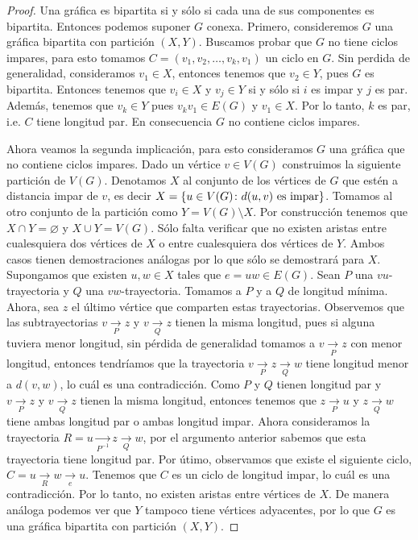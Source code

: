 \begin{proof}
    Una gr\'afica es bipartita si y s\'olo si cada una de sus componentes es
    bipartita. Entonces podemos suponer $G$ conexa. Primero, consideremos $G$
    una gr\'afica bipartita con partici\'on $(X,Y)$. Buscamos probar que $G$ no
    tiene ciclos impares, para esto tomamos $C=(v_1,v_2,\dots, v_k,v_1)$ un
    ciclo en $G$. Sin perdida de generalidad, consideramos $v_1 \in X$, entonces
    tenemos que $v_2 \in Y$, pues $G$ es bipartita. Entonces tenemos que $v_i
    \in X$ y $v_j \in Y$ si y s\'olo si $i$ es impar y $j$ es par. Adem\'as,
    tenemos que $v_k \in Y$ pues $v_k v_1 \in E(G)$ y $v_1 \in X$. Por lo tanto,
    $k$ es par, i.e. $C$ tiene longitud par. En consecuencia $G$ no contiene
    ciclos impares.

    Ahora veamos la segunda implicaci\'on, para esto consideramos $G$ una
    gr\'afica que no contiene ciclos impares. Dado un v\'ertice $v \in V(G)$
    construimos la siguiente partici\'on de $V(G)$. Denotamos $X$ al conjunto de
    los v\'ertices de $G$ que est\'en a distancia impar de $v$, es decir $X =
    \{u \in V(G) \colon d(u,v) \textnormal{ es impar}\}$. Tomamos al otro
    conjunto de la partici\'on como $Y = V(G)\setminus X$. Por construcci\'on
    tenemos que $X \cap Y = \varnothing$ y $X \cup Y = V(G)$. S\'olo falta
    verificar que no existen aristas entre cualesquiera dos v\'ertices de $X$ o
    entre cualesquiera dos v\'ertices de $Y$. Ambos casos tienen demostraciones
    an\'alogas por lo que s\'olo se demostrar\'a para $X$. Supongamos que
    existen $u,w \in X$ tales que $e=uw \in E(G)$. Sean $P$ una $vu$-trayectoria
    y $Q$ una $vw$-trayectoria. Tomamos a $P$ y a $Q$ de longitud m\'inima.
    Ahora, sea $z$ el \'ultimo v\'ertice que comparten estas trayectorias.
    Observemos que las subtrayectorias $v \xrightarrow[P]{}z$ y $v
    \xrightarrow[Q]{}z$ tienen la misma longitud, pues si alguna tuviera menor
    longitud, sin p\'erdida de generalidad tomamos a $v \xrightarrow[P]{}z$ con
    menor longitud, entonces tendr\'iamos que la trayectoria $v
    \xrightarrow[P]{}z\xrightarrow[Q]{}w$ tiene longitud menor a $d(v,w)$, lo
    cu\'al es una contradicci\'on. Como $P$ y $Q$ tienen longitud par y $v
    \xrightarrow[P]{}z$ y $v \xrightarrow[Q]{}z$ tienen la misma longitud,
    entonces tenemos que $z \xrightarrow[P]{}u$ y $z \xrightarrow[Q]{}w$ tiene
    ambas longitud par o ambas longitud impar. Ahora consideramos la trayectoria
    $ R= u \xrightarrow[P^{-1}]{}z \xrightarrow[Q]{}w$, por el argumento
    anterior sabemos que esta trayectoria tiene longitud par. Por \'utimo,
    observamos que existe el siguiente ciclo,
    $C=u\xrightarrow[R]{}w\xrightarrow[e]{}u$. Tenemos que $C$ es un ciclo de
    longitud impar, lo cu\'al es una contradicci\'on. Por lo tanto, no existen
    aristas entre v\'ertices de $X$. De manera an\'aloga podemos ver que $Y$
    tampoco tiene v\'ertices adyacentes, por lo que $G$ es una gr\'afica
    bipartita con partici\'on $(X,Y)$.
\end{proof}
    
